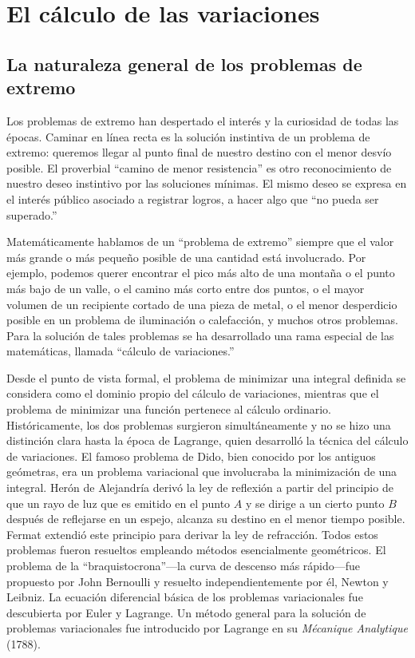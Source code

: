 \documentclass[12pt,a4paper]{book}
\begin{document}
\chapter{El cálculo de las variaciones}

\section{La naturaleza general de los problemas de extremo}

Los problemas de extremo han despertado el interés y la curiosidad de todas las épocas. Caminar en línea recta es la solución instintiva de un problema de extremo: queremos llegar al punto final de nuestro destino con el menor desvío posible. El proverbial ``camino de menor resistencia'' es otro reconocimiento de nuestro deseo instintivo por las soluciones mínimas. El mismo deseo se expresa en el interés público asociado a registrar logros, a hacer algo que ``no pueda ser superado.''

Matemáticamente hablamos de un ``problema de extremo'' siempre que el valor más grande o más pequeño posible de una cantidad está involucrado. Por ejemplo, podemos querer encontrar el pico más alto de una montaña o el punto más bajo de un valle, o el camino más corto entre dos puntos, o el mayor volumen de un recipiente cortado de una pieza de metal, o el menor desperdicio posible en un problema de iluminación o calefacción, y muchos otros problemas. Para la solución de tales problemas se ha desarrollado una rama especial de las matemáticas, llamada ``cálculo de variaciones.''

Desde el punto de vista formal, el problema de minimizar una integral definida se considera como el dominio propio del cálculo de variaciones, mientras que el problema de minimizar una función pertenece al cálculo ordinario. Históricamente, los dos problemas surgieron simultáneamente y no se hizo una distinción clara hasta la época de Lagrange, quien desarrolló la técnica del cálculo de variaciones. El famoso problema de Dido, bien conocido por los antiguos geómetras, era un problema variacional que involucraba la minimización de una integral. Herón de Alejandría derivó la ley de reflexión a partir del principio de que un rayo de luz que es emitido en el punto $A$ y se dirige a un cierto punto $B$ después de reflejarse en un espejo, alcanza su destino en el menor tiempo posible. Fermat extendió este principio para derivar la ley de refracción. Todos estos problemas fueron resueltos empleando métodos esencialmente geométricos. El problema de la ``braquistocrona''---la curva de descenso más rápido---fue propuesto por John Bernoulli y resuelto independientemente por él, Newton y Leibniz. La ecuación diferencial básica de los problemas variacionales fue descubierta por Euler y Lagrange. Un método general para la solución de problemas variacionales fue introducido por Lagrange en su \textit{Mécanique Analytique} (1788).
\end{document}
